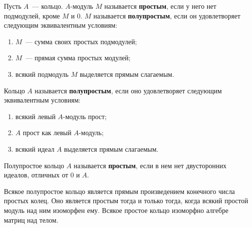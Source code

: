 \documentclass[a4paper,oneside,12pt]{article}
\theoremstyle{plain} { \swapnumbers
\newtheorem{theorem}{Теорема}[subsection]
\newtheorem{corollary}[theorem]{Следствие}
\newtheorem{lemma}[theorem]{Лемма}
\newtheorem{proposition}[theorem]{Утверждение}
\newtheorem{claim}[theorem]{Факт}
}
\theoremstyle{definition} { \swapnumbers
\newtheorem{definition}[theorem]{Определение}
\newtheorem{notation}[theorem]{Обозначение}
\newtheorem{remark}[theorem]{Замечание}
\newtheorem{remarks}[theorem]{Замечания}
\newtheorem{example}[theorem]{Пример}
\newtheorem{examples}[theorem]{Примеры}
\newtheorem{sssection}[theorem]{}
}
\begin{document}
\begin{definition}
Пусть $A$~--- кольцо. $A$-модуль $M$ называется {\bf простым}, если у него нет
подмодулей, кроме $M$ и $0$. $M$ называется {\bf полупростым}, если он удовлетворяет
следующим эквивалентным условиям:
\begin{enumerate}
\item $M$~--- сумма своих простых подмодулей;
\item $M$~--- прямая сумма простых модулей;
\item всякий подмодуль $M$ выделяется прямым слагаемым.
\end{enumerate}
\end{definition}

\begin{definition}
Кольцо $A$ называется {\bf полупростым}, если оно удовлетворяет
следующим эквивалентным условиям:
\begin{enumerate}
\item всякий левый $A$-модуль прост;
\item $A$ прост как левый $A$-модуль;
\item всякий идеал $A$ выделяется прямым слагаемым.
\end{enumerate}
Полупростое кольцо $A$ называется {\bf простым}, если в нем нет двусторонних идеалов,
отличных от $0$ и $A$.
\end{definition}

\begin{theorem}
Всякое полупростое кольцо является прямым произведением конечного числа простых колец.
Оно является простым тогда и только тогда, когда всякий простой модуль над ним
изоморфен ему. Всякое простое кольцо изоморфно алгебре матриц над телом.
\end{theorem}
\end{document}
